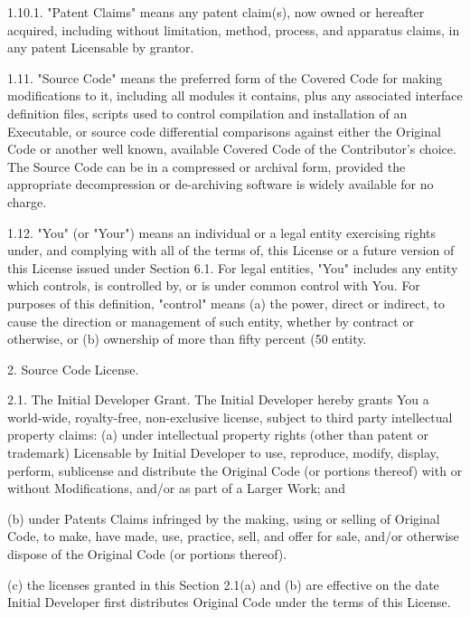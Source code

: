 \begin{DoxyCode}
     1.10.1. "Patent Claims" means any patent claim(s), now owned or
     hereafter acquired, including without limitation,  method, process,
     and apparatus claims, in any patent Licensable by grantor.

     1.11. "Source Code" means the preferred form of the Covered Code for
     making modifications to it, including all modules it contains, plus
     any associated interface definition files, scripts used to control
     compilation and installation of an Executable, or source code
     differential comparisons against either the Original Code or another
     well known, available Covered Code of the Contributor's choice. The
     Source Code can be in a compressed or archival form, provided the
     appropriate decompression or de-archiving software is widely available
     for no charge.

     1.12. "You" (or "Your")  means an individual or a legal entity
     exercising rights under, and complying with all of the terms of, this
     License or a future version of this License issued under Section 6.1.
     For legal entities, "You" includes any entity which controls, is
     controlled by, or is under common control with You. For purposes of
     this definition, "control" means (a) the power, direct or indirect,
     to cause the direction or management of such entity, whether by
     contract or otherwise, or (b) ownership of more than fifty percent
     (50%
     entity.

2. Source Code License.

     2.1. The Initial Developer Grant.
     The Initial Developer hereby grants You a world-wide, royalty-free,
     non-exclusive license, subject to third party intellectual property
     claims:
          (a)  under intellectual property rights (other than patent or
          trademark) Licensable by Initial Developer to use, reproduce,
          modify, display, perform, sublicense and distribute the Original
          Code (or portions thereof) with or without Modifications, and/or
          as part of a Larger Work; and

          (b) under Patents Claims infringed by the making, using or
          selling of Original Code, to make, have made, use, practice,
          sell, and offer for sale, and/or otherwise dispose of the
          Original Code (or portions thereof).

          (c) the licenses granted in this Section 2.1(a) and (b) are
          effective on the date Initial Developer first distributes
          Original Code under the terms of this License.


\end{DoxyCode}
